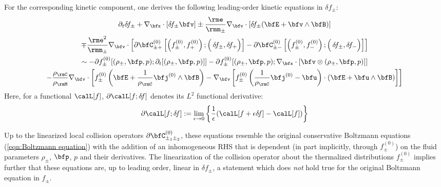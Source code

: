     For the corresponding kinetic component, one derives the following leading-order kinetic equations in $\delta\!f_{\pm}$:
    \begin{multline}\label{eqn:linearized Boltzmann equation}
        \partial_{t}\delta\!f_{\pm} + \nabla_{\bfx}\cdot[\delta\!f_{\pm}\bfv] \pm \frac{\rme}{\rmm_{\pm}}\nabla_{\bfv}\cdot[\delta\!f_{\pm}(\bfE + \bfv\wedge\bfB)]  \\
        \mp \frac{\rme^{2}}{\rmm_{\pm}}\nabla_{\bfv}\cdot\left[\partial\bfC_{\pm+}^{(0)}\left[\left(f_{\pm}^{(0)}, f_{+}^{(0)}\right); \left({\color{white} f_{+}^{(0)}}\!\!\!\!\!\!\!\!\!\delta\!f_{\pm}, \delta\!f_{+}\right)\right] - \partial\bfC_{\pm-}^{(0)}\left[\left(f_{\pm}^{(0)}, f_{-}^{(0)}\right); \left({\color{white} f_{+}^{(0)}}\!\!\!\!\!\!\!\!\!\delta\!f_{\pm}, \delta\!f_{-}\right)\right]\right]  \\
        \sim  - \partial f_{\pm}^{(0)}[(\rho_{\pm}, \bfp, p); \partial_{t}[(\rho_{\pm}, \bfp, p)]] - \partial f_{\pm}^{(0)}[(\rho_{\pm}, \bfp, p); \nabla_{\bfx}\cdot[\bfv\otimes(\rho_{\pm}, \bfp, p)]]  \\
        - \frac{\rho_{\rmC}}{\rho_{\rmM}}\nabla_{\bfv}\cdot\left[f_{\pm}^{(0)}\left(\bfE + \frac{1}{\rho_{\rmC}}\bfj^{(0)}\wedge\bfB\right) - \nabla_{\bfv}\left[f_{\pm}^{(0)}\left(\frac{1}{\rho_{\rmC}}\bfj^{(0)} - \bfu\right)\cdot\left(\bfE + \bfu\wedge\bfB\right)\right]\right]
    \end{multline}
    Here, for a functional $\calL[f]$, $\partial\calL[f; \delta\!f]$ denotes its $L^{2}$ functional derivative:
    \begin{equation}
        \partial\calL[f; \delta\!f]  :=  \lim_{\epsilon \rightarrow 0}\left\{\frac{1}{\epsilon}(\calL[f + \epsilon\delta\!f] - \calL[f])\right\}
    \end{equation}
    
    Up to the linearized local collision operators $\partial\bfC_{\pm_{1}\pm_{2}}^{(0)}$, these equations resemble the original conservative Boltzmann equations (\ref{eqn:Boltzmann equation}) with the addition of an inhomogeneous RHS that is dependent (in part implicitly, through $f_{\pm}^{(0)}$) on the fluid parameters $\rho_{\pm}$, $\bfp$, $p$ and their derivatives. The linearization of the collision operator about the thermalized distributions $f_{\pm}^{(0)}$ implies further that these equations are, up to leading order, linear in $\delta\!f_{\pm}$, a statement which does \emph{not} hold true for the original Boltzmann equation in $f_{\pm}$.
    
